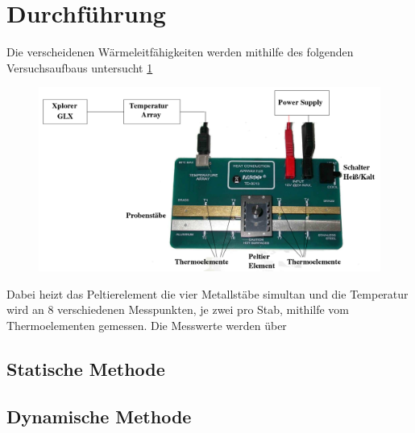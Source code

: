 \section{Durchführung}
\label{sec:Durchführung}
Die verscheidenen Wärmeleitfähigkeiten werden mithilfe des folgenden Versuchsaufbaus 
untersucht \ref{fig:aufbau}
\begin{figure}
\centering
\includegraphics{content/aufbau.png}
\label{fig:aufbau}
\end{figure}
Dabei heizt das Peltierelement die vier Metallstäbe simultan und die Temperatur wird an 8 
verschiedenen Messpunkten, je zwei pro Stab, mithilfe vom Thermoelementen gemessen. Die 
Messwerte werden über 

\subsection{Statische Methode}
\label{sec:statische Methode}


\subsection{Dynamische Methode}
\label{sec:dynamische Methode}


